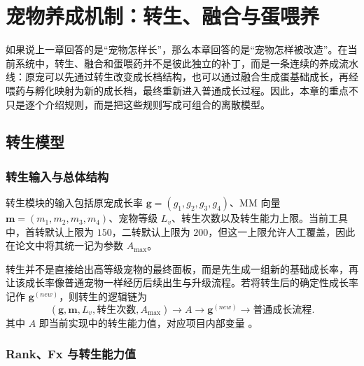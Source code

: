 \chapter{宠物养成机制：转生、融合与蛋喂养}

如果说上一章回答的是“宠物怎样长”，那么本章回答的是“宠物怎样被改造”。在当前系统中，转生、融合和蛋喂药并不是彼此独立的补丁，而是一条连续的养成流水线：原宠可以先通过转生改变成长档结构，也可以通过融合生成蛋基础成长，再经喂药与孵化映射为新的成长档，最终重新进入普通成长过程。因此，本章的重点不只是逐个介绍规则，而是把这些规则写成可组合的离散模型。

\section{转生模型}

\subsection{转生输入与总体结构}

转生模块的输入包括原宠成长率 $\bm{g}=(g_1,g_2,g_3,g_4)$、MM 向量 $\bm{m}=(m_1,m_2,m_3,m_4)$、宠物等级 $L_v$、转生次数以及转生能力上限。当前工具中，首转默认上限为 $150$，二转默认上限为 $200$，但这一上限允许人工覆盖，因此在论文中将其统一记为参数 $A_{\max}$。

转生并不是直接给出高等级宠物的最终面板，而是先生成一组新的基础成长率，再让该成长率像普通宠物一样经历后续出生与升级流程。若将转生后的确定性成长率记作 $\bm{g}^{(new)}$，则转生的逻辑链为
\begin{equation}
    (\bm{g},\bm{m},L_v,\text{转生次数},A_{\max})
    \longrightarrow A
    \longrightarrow \bm{g}^{(new)}
    \longrightarrow \text{普通成长流程}.
\end{equation}
其中 $A$ 即当前实现中的转生能力值，对应项目内部变量 。

\subsection{Rank、Fx 与转生能力值}

